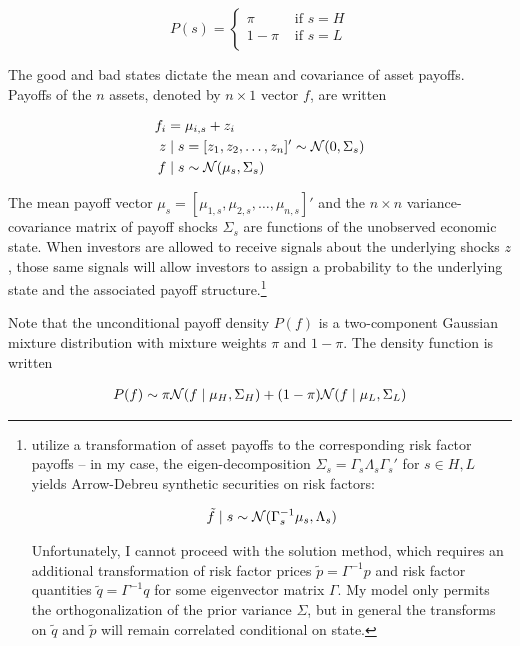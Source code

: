 \documentclass{article}
\begin{document}
$$
P(s) = \begin{cases}
    \pi & \text{ if } s = H \\
    1-\pi & \text{ if } s = L \\
\end{cases}
$$

The good and bad states dictate the mean and covariance of asset payoffs. Payoffs of the $n$ assets, denoted by $n\times 1$ vector $f$, are written

\begin{align}
    f_i &= \mu_{i,s} + z_i\\
    z &\mid s = [z_1,z_2, \dots, z_n]' \sim \mathcal{N}(0, \Sigma_s) \\
    f &\mid s \sim \mathcal{N}(\mu_{s}, \Sigma_s)
\end{align}

The mean payoff vector $\mu_s = [\mu_{1,s},\mu_{2,s},\dots,\mu_{n,s}]'$ and the  $n\times n$ variance-covariance matrix of payoff shocks $\Sigma_s$ are functions of the unobserved economic state. When investors are allowed to receive signals about the underlying shocks $z$, those same signals will allow investors to assign a probability to the underlying state and the associated payoff structure.\footnote{\textcite{kacperczyk_rational_2016} utilize a transformation of asset payoffs to the corresponding risk factor payoffs -- in my case, the eigen-decomposition $\Sigma_s = \Gamma_s \Lambda_s \Gamma_s'$ for $s \in {H,L}$ yields Arrow-Debreu synthetic securities on risk factors:

\begin{align}
    \tilde f \mid s \sim \mathcal{N}(\Gamma_s^{-1} \mu_s, \Lambda_s)
\end{align}

\noindent Unfortunately, I cannot proceed with the \textcite{kacperczyk_rational_2016} solution method, which requires an additional transformation of risk factor prices $\tilde p = \Gamma^{-1}p$ and risk factor quantities $\tilde q = \Gamma^{-1} q$ for some eigenvector matrix $\Gamma$. My model only permits the orthogonalization of the prior variance $\Sigma$, but in general the transforms on $\tilde q$ and $\tilde p$ will remain correlated conditional on state.


}

Note that the unconditional payoff density $P(f)$ is a two-component Gaussian mixture distribution with mixture weights $\pi$ and $1-\pi$. The density function is written

\begin{align}
    P(f) \sim \pi \mathcal{N}(f \mid \mu_H, \Sigma_H) + (1-\pi) \mathcal{N} (f \mid \mu_L, \Sigma_L)
\end{align}
\end{document}
